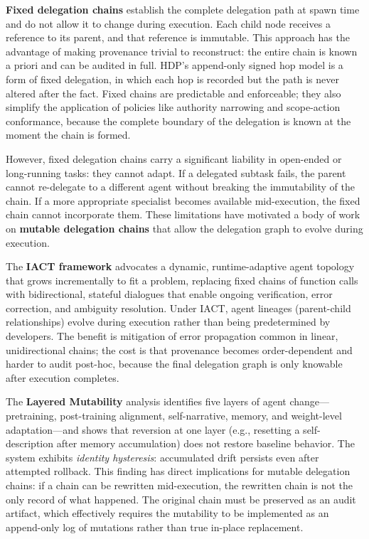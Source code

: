 \textbf{Fixed delegation chains} establish the complete delegation path at spawn time and do not allow it to change during execution. Each child node receives a reference to its parent, and that reference is immutable. This approach has the advantage of making provenance trivial to reconstruct: the entire chain is known a priori and can be audited in full. HDP's append-only signed hop model is a form of fixed delegation, in which each hop is recorded but the path is never altered after the fact. Fixed chains are predictable and enforceable; they also simplify the application of policies like authority narrowing and scope-action conformance, because the complete boundary of the delegation is known at the moment the chain is formed.

However, fixed delegation chains carry a significant liability in open-ended or long-running tasks: they cannot adapt. If a delegated subtask fails, the parent cannot re-delegate to a different agent without breaking the immutability of the chain. If a more appropriate specialist becomes available mid-execution, the fixed chain cannot incorporate them. These limitations have motivated a body of work on \textbf{mutable delegation chains} that allow the delegation graph to evolve during execution.

The \textbf{IACT framework} \cite{agenthive2025} advocates a dynamic, runtime-adaptive agent topology that grows incrementally to fit a problem, replacing fixed chains of function calls with bidirectional, stateful dialogues that enable ongoing verification, error correction, and ambiguity resolution. Under IACT, agent lineages (parent-child relationships) evolve during execution rather than being predetermined by developers. The benefit is mitigation of error propagation common in linear, unidirectional chains; the cost is that provenance becomes order-dependent and harder to audit post-hoc, because the final delegation graph is only knowable after execution completes.

The \textbf{Layered Mutability} analysis \cite{layeredmutability2026} identifies five layers of agent change---pretraining, post-training alignment, self-narrative, memory, and weight-level adaptation---and shows that reversion at one layer (e.g., resetting a self-description after memory accumulation) does not restore baseline behavior. The system exhibits \textit{identity hysteresis}: accumulated drift persists even after attempted rollback. This finding has direct implications for mutable delegation chains: if a chain can be rewritten mid-execution, the rewritten chain is not the only record of what happened. The original chain must be preserved as an audit artifact, which effectively requires the mutability to be implemented as an append-only log of mutations rather than true in-place replacement.

